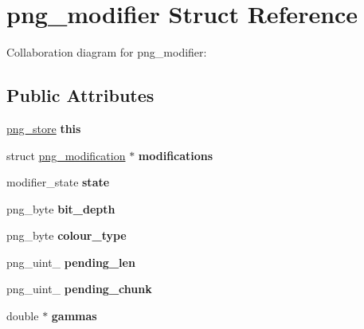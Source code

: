 \hypertarget{structpng__modifier}{\section{png\+\_\+modifier Struct Reference}
\label{structpng__modifier}
}


Collaboration diagram for png\+\_\+modifier\+:
\subsection*{Public Attributes}
\begin{DoxyCompactItemize}
\item 
\hypertarget{structpng__modifier_a8375d7a1680b369787a4b6af72994e9a}{\hyperlink{structpng__store}{png\+\_\+store} {\bfseries this}}\label{structpng__modifier_a8375d7a1680b369787a4b6af72994e9a}

\item 
\hypertarget{structpng__modifier_a32d0ddd98269408822080479a30940ea}{struct \hyperlink{structpng__modification}{png\+\_\+modification} $\ast$ {\bfseries modifications}}\label{structpng__modifier_a32d0ddd98269408822080479a30940ea}

\item 
\hypertarget{structpng__modifier_a8e9ae164f2263ed106b0ed5c1d16e4a6}{modifier\+\_\+state {\bfseries state}}\label{structpng__modifier_a8e9ae164f2263ed106b0ed5c1d16e4a6}

\item 
\hypertarget{structpng__modifier_ac8bffe5aaaedca1ebaaaec3d2e0d9484}{png\+\_\+byte {\bfseries bit\+\_\+depth}}\label{structpng__modifier_ac8bffe5aaaedca1ebaaaec3d2e0d9484}

\item 
\hypertarget{structpng__modifier_a03811c13976efbb4cd663f1dcf658e9a}{png\+\_\+byte {\bfseries colour\+\_\+type}}\label{structpng__modifier_a03811c13976efbb4cd663f1dcf658e9a}

\item 
\hypertarget{structpng__modifier_afd3c0d3d15c3ee2a079c50c3c23c22c6}{png\+\_\+uint\+\_ {\bfseries pending\+\_\+len}}\label{structpng__modifier_afd3c0d3d15c3ee2a079c50c3c23c22c6}

\item 
\hypertarget{structpng__modifier_ace466e81b03321e301a300547b559cb6}{png\+\_\+uint\+\_ {\bfseries pending\+\_\+chunk}}\label{structpng__modifier_ace466e81b03321e301a300547b559cb6}

\item 
\hypertarget{structpng__modifier_af4b7bb96f8d9b67bb3ae6cd7fe1b8bfc}{double $\ast$ {\bfseries gammas}}\label{structpng__modifier_af4b7bb96f8d9b67bb3ae6cd7fe1b8bfc}


\end{DoxyCompactItemize}
